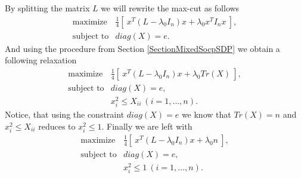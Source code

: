 \documentclass[12pt]{book}
\theoremstyle{definition}
\begin{document}
By splitting the matrix $L$ we will rewrite the max-cut as follows
\begin{equation*}
\begin{array}{ll}
\mbox{maximize} & \frac{1}{4}\left[ \ x^T(L- \lambda_{0} I_n)x + \lambda_0x^TI_nx \ \right], \\
\mbox{subject to} & diag(X) = e .
\end{array}
\end{equation*}
And using the procedure from Section \ref{SectionMixedSocpSDP} we obtain a following relaxation 
%
\begin{equation*}
\begin{array}{ll}
\mbox{maximize} & \frac{1}{4}\left[ \ x^T(L- \lambda_{0} I_n)x + \lambda_0Tr(X) \ \right], \\
\mbox{subject to} & diag(X) = e ,\\
&	x_i^2\leq X_{ii} \ (i=1,\dots ,n).
\end{array}
\end{equation*}
Notice, that using the constraint $diag(X) = e$ we know that $Tr(X) = n$ and $x_i^2\leq X_{ii}$ reduces to $x_i^2\leq 1$. Finally we are left with  
\begin{equation}
\label{MaxCutMixedSocpSdp1}
\begin{array}{ll}
\mbox{maximize} & \frac{1}{4}\left[ \ x^T(L- \lambda_{0} I_n)x + \lambda_0n \ \right], \\
\mbox{subject to} & diag(X) = e ,\\
&	x_i^2\leq 1 \ (i=1,\dots ,n).
\end{array}
\end{equation}
\end{document}
